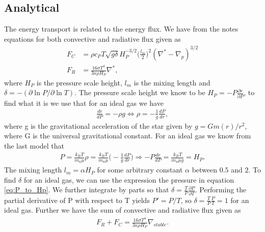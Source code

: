 \documentclass[a4paper,10pt]{article}
\begin{document}
\subsection{Analytical}
The energy transport is related to the energy flux. We have from the notes equations for both convective and radiative flux given as
%
\begin{align}\label{eq:Fc}
F_C &= \rho c_P T \sqrt{g\delta}H_P^{-3/2}\bigg(\frac{l_m}{2}\bigg)^2(\nabla^* - \nabla_p)^{3/2} \\
F_R &= \frac{16\sigma T^4}{3\kappa \rho H_P}\nabla^*,\label{eq:Fr}
\end{align}
%
where $H_P$ is the pressure scale height, $l_m$ is the mixing length and $\delta = -(\partial \ln P/\partial \ln T)$. The pressure scale height we know to be $H_P = -P\frac{\partial r}{\partial P}$, to find what it is we use that for an ideal gas we have
%
\begin{align*}
\frac{dr}{dP} = -\rho g \Leftrightarrow \rho = -\frac{1}{g}\frac{dP}{dr},
\end{align*}
%
where g is the gravitational acceleration of the star given by $g = Gm(r)/r^2$, where G is the universal gravitational constant. For an ideal gas we know from the last model that 
%
\begin{align}\label{eq:P_to_Hp}
P = \frac{k_B T}{m_u \mu} \rho = \frac{k_B T}{m_u \mu} \bigg(-\frac{1}{g}\frac{dP}{dr}\bigg)
\Rightarrow -P\frac{dr}{dP} = \frac{k_B T}{m_u \mu g} = H_P.
\end{align}
%
The mixing length $l_m = \alpha H_P$ for some arbitrary constant $\alpha$ between $0.5$ and $2$. To find $\delta$ for an ideal gas, we can use the expression the pressure in equation \eqref{eq:P_to_Hp}. We further integrate by parts so that $\delta = \frac{T}{P}\frac{\partial P}{\partial T}$. Performing the partial derivative of P with respect to T yields $P' = P/T$, so $\delta = \frac{T}{P}\frac{P}{T} = 1$ for an ideal gas. Further we have the sum of convective and radiative flux given as
%
\begin{align}\label{eq:Fc+Fr}
F_R + F_C = \frac{16\sigma T^4}{3\kappa \rho H_P}\nabla_{stable}.
\end{align}
\end{document}
